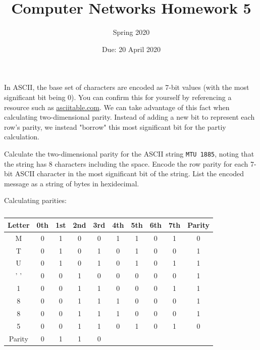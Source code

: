 \documentclass[12pt,addpoints,answers]{exam}
\title{Computer Networks Homework 5}
\author{Spring 2020}
\date{Due: 20 April 2020}
\begin{document}
\maketitle

\begin{questions}
\question[8] In ASCII, the base set of characters are encoded as 7-bit values (with the most significant bit being 0). You can confirm this for yourself by referencing a resource such as \url{asciitable.com}. We can take advantage of this fact when calculating two-dimensional parity. Instead of adding a new bit to represent each row's parity, we instead "borrow" this most significant bit for the partiy calculation.

Calculate the two-dimensional parity for the ASCII string \lstinline[showspaces=true]{MTU 1885}, noting that the string has 8 characters including the space. Encode the row parity for each 7-bit ASCII character in the most significant bit of the string. List the encoded message as a string of bytes in hexidecimal.
\begin{solution}
	Calculating parities:
	\begin{table}[H]
		\centering
		\caption{}
		\label{tab:my-table}
		\begin{tabular}{|c|cccccccc|c|}
			\hline
			Letter &
			\multicolumn{1}{c|}{0th} &
			\multicolumn{1}{c|}{1st} &
			\multicolumn{1}{c|}{2nd} &
			\multicolumn{1}{c|}{3rd} &
			\multicolumn{1}{c|}{4th} &
			\multicolumn{1}{c|}{5th} &
			\multicolumn{1}{c|}{6th} &
			7th &
			Parity \\ \hline
			M   & 0 & 1 & 0 & 0 & 1 & 1 & 0 & 1 & 0 \\ \cline{1-1} \cline{10-10} 
			T   & 0 & 1 & 0 & 1 & 0 & 1 & 0 & 0 & 1 \\ \cline{1-1} \cline{10-10} 
			U   & 0 & 1 & 0 & 1 & 0 & 1 & 0 & 1 & 1 \\ \cline{1-1} \cline{10-10} 
			' ' & 0 & 0 & 1 & 0 & 0 & 0 & 0 & 0 & 1 \\ \cline{1-1} \cline{10-10} 
			1   & 0 & 0 & 1 & 1 & 0 & 0 & 0 & 1 & 1 \\ \cline{1-1} \cline{10-10} 
			8   & 0 & 0 & 1 & 1 & 1 & 0 & 0 & 0 & 1 \\ \cline{1-1} \cline{10-10} 
			8   & 0 & 0 & 1 & 1 & 1 & 0 & 0 & 0 & 1 \\ \cline{1-1} \cline{10-10} 
			5   & 0 & 0 & 1 & 1 & 0 & 1 & 0 & 1 & 0 \\ \hline
			Parity &
			\multicolumn{1}{c|}{0} &
			\multicolumn{1}{c|}{1} &
			\multicolumn{1}{c|}{1} &
			\multicolumn{1}{c|}{0} &

\end{tabular}
\end{table}
\end{solution}
\end{questions}
\end{document}

